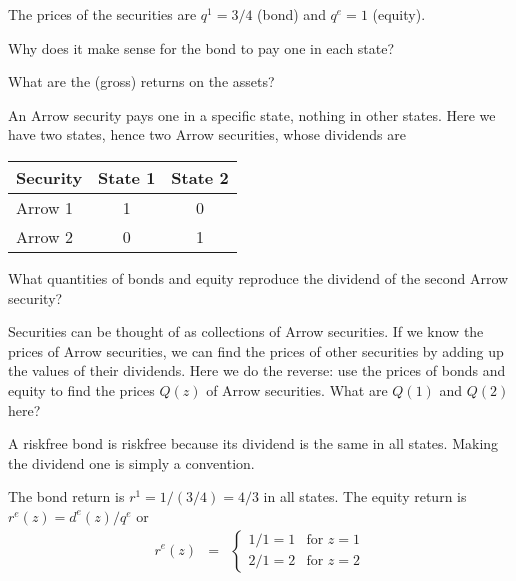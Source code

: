 \documentclass[11pt]{exam}
\begin{document}
\begin{questions}
\medskip
The prices of the securities are $q^1 = 3/4$ (bond) and $q^e = 1$ (equity).

\begin{parts}
\item Why does it make sense for the bond to pay one in each state?
\item What are the (gross) returns on the assets?
\item An Arrow security pays one in a specific state, nothing in other states.
Here we have two states, hence two Arrow securities, whose dividends are

\bigskip
\begin{center}
\begin{tabular}{lcc}
\toprule
Security  &  State 1 & State 2 \\
\midrule
Arrow 1     &  1    &   0  \\
Arrow 2     &  0    &   1  \\
\bottomrule
\end{tabular}
\end{center}

\medskip
What quantities of bonds and equity reproduce the dividend of the second Arrow
security?

\item Securities can be thought of as collections of Arrow securities.
If we know the prices of Arrow securities, we can find the prices
of other securities by adding up the values of their dividends.
Here we do the reverse:  use the prices of bonds and equity to
find the prices $Q(z)$ of Arrow securities.
What are $Q(1)$ and $Q(2)$ here?
\end{parts}

\begin{solution}
\begin{parts}
\item A riskfree bond is riskfree because its dividend is the same
in all states.
Making the dividend one is simply a convention.

\item The bond return is $ r^1 = 1/(3/4) = 4/3 $ in all states.
The equity return is $r^e(z) = d^e(z)/q^e $ or
\begin{eqnarray*}
    r^e(z) &=&
        \left\{
        \begin{array}{ll}
        1/1 = 1 &  \mbox{for } z=1 \\
        2/1 = 2 &  \mbox{for } z=2
        \end{array}
        \right.
\end{eqnarray*}


\end{parts}
\end{solution}
\end{questions}
\end{document}
